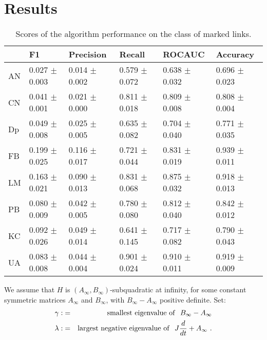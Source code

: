 \documentclass{llncs}
\begin{document}
\section{Results}
%
\setlength{\tabcolsep}{5pt}
\renewcommand{\arraystretch}{1.5}
\begin{table}
\begin{center}
\caption{Scores of the algorithm performance on the class of marked links.}
\begin{tabular}{| l | l | l | l | l | l |}
\hline
& F1 & Precision & Recall & ROCAUC & Accuracy  \\ \hline
AN & 0.027 $\pm$ 0.003 & 0.014 $\pm$ 0.002 & 0.579 $\pm$ 0.072 & 0.638 $\pm$ 0.032 & 0.696 $\pm$ 0.023  \\ \hline
CN & 0.041 $\pm$ 0.001 & 0.021 $\pm$ 0.000 & 0.811 $\pm$ 0.018 & 0.809 $\pm$ 0.008 & 0.808 $\pm$ 0.004  \\ \hline
Dp & 0.049 $\pm$ 0.008 & 0.025 $\pm$ 0.005 & 0.635 $\pm$ 0.082 & 0.704 $\pm$ 0.040 & 0.771 $\pm$ 0.035  \\ \hline
FB & 0.199 $\pm$ 0.025 & 0.116 $\pm$ 0.017 & 0.721 $\pm$ 0.044 & 0.831 $\pm$ 0.019 & 0.939 $\pm$ 0.011  \\ \hline
LM & 0.163 $\pm$ 0.021 & 0.090 $\pm$ 0.013 & 0.831 $\pm$ 0.068 & 0.875 $\pm$ 0.032 & 0.918 $\pm$ 0.013 \\ \hline
PB & 0.080 $\pm$ 0.009 & 0.042 $\pm$ 0.005 & 0.780 $\pm$ 0.080 & 0.812 $\pm$ 0.040 & 0.842 $\pm$ 0.012  \\ \hline
KC & 0.092 $\pm$ 0.026 & 0.049 $\pm$ 0.014 & 0.641 $\pm$ 0.145 & 0.717 $\pm$ 0.082 & 0.790 $\pm$  0.043 \\ \hline
UA & 0.083 $\pm$ 0.008 & 0.044 $\pm$ 0.004 & 0.901 $\pm$ 0.024 & 0.910 $\pm$ 0.011 & 0.919 $\pm$ 0.009  \\ 
\hline
\end{tabular}
\end{center}
\end{table}
%
We assume that $H$ is
$\left(A_{\infty},B_{\infty}\right)$-sub\-qua\-dra\-tic at infinity,
for some constant symmetric matrices $A_{\infty}$ and $B_{\infty}$,
with $B_{\infty}-A_{\infty}$ positive definite. Set:
\begin{eqnarray}
\gamma :&=&{\rm smallest\ eigenvalue\ of}\ \ B_{\infty} - A_{\infty} \\
  \lambda : &=& {\rm largest\ negative\ eigenvalue\ of}\ \
  J \frac{d}{dt} +A_{\infty}\ .
\end{eqnarray}
\end{document}
